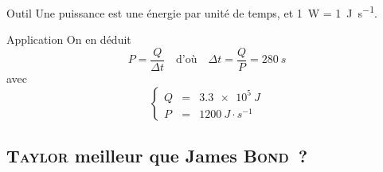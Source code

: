 \documentclass[../main/main.tex]{subfiles}
\begin{document}
\begin{enumerate}
\begin{tcbraster}[raster columns=2, raster equal height=rows]
\begin{tcolorbox}[blankest, raster multicolumn=1, space to=\myspace]
\begin{tcbraster}[raster columns=1]
\begin{NCrapp}[]{Outil}
                        Une puissance est une énergie par unité de temps, et
                        \SI{1}{W} = \SI{1}{J.s^{-1}}.

                    \end{NCrapp}
                \end{tcbraster}
            \end{tcolorbox}
            \begin{NCexem}[raster multicolumn=1]{Application}
                On en déduit
                \[P = \frac{Q}{\Delta t}
                    \quad\text{d'où}\quad
                \boxed{\Delta t = \frac{Q}{P} = \SI{280}{s}}\]
                avec
                \[\left\{
                    \begin{array}{rcl}
                        Q & = & \SI{3.3e5}{J}\\
                        P & = & \SI{1200}{J⋅s^{-1}}
                    \end{array}
                \right.\]
            \end{NCexem}
        \end{tcbraster}
\end{enumerate}

\subsection{\textsc{Taylor} meilleur que James \textsc{Bond}~?}
\end{document}
